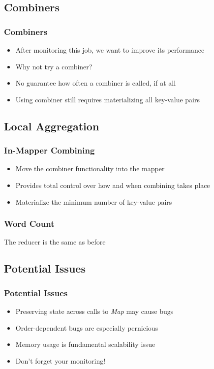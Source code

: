 \documentclass[xcolor=x11names,compress]{beamer}
\renewcommand{\(}{\begin{columns}}
\renewcommand{\)}{\end{columns}}
\newcommand{\<}[1]{\begin{column}{#1}}
\renewcommand{\>}{\end{column}}
\begin{document}
\subsection{Combiners}

\begin{frame}
  \frametitle{Combiners}
  \begin{itemize}
  \item<1> After monitoring this job, we want to improve its performance
  \item<2> Why not try a combiner?
  \item<3,4> No guarantee how often a combiner is called, if at all
  \item<4> Using combiner still requires materializing all key-value pairs
  \end{itemize}
\end{frame}

\subsection{Local Aggregation}

\begin{frame}
  \frametitle{In-Mapper Combining}
  \begin{itemize}
  \item<1> Move the combiner functionality into the mapper
  \item<2,3> Provides total control over how and when combining takes place
  \item<3> Materialize the minimum number of key-value pairs
  \end{itemize}
\end{frame}
\begin{frame}
  \frametitle{Word Count}
  The reducer is the same as before
  \begin{algorithm}[H]
  \end{algorithm}
\end{frame}

\subsection{Potential Issues}
\begin{frame}
  \frametitle{Potential Issues}
  \begin{itemize}
  \item<1,2> Preserving state across calls to \emph{Map} may cause bugs
  \item<2> Order-dependent bugs are especially pernicious
  \item<3,4> Memory usage is fundamental scalability issue
  \item<4> Don't forget your monitoring!
  \end{itemize}
\end{frame}
\end{document}
